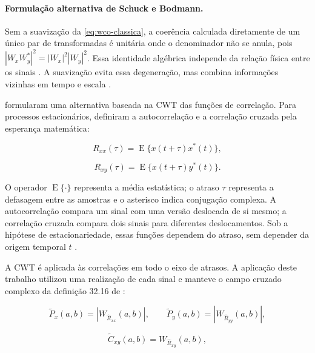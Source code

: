 \paragraph{Formulação alternativa de Schuck e Bodmann.}

Sem a suavização da \autoref{eq:wco-classica}, a coerência calculada diretamente de
um único par de transformadas é unitária onde o denominador não se anula, pois
$|W_xW_y^*|^2=|W_x|^2|W_y|^2$. Essa identidade algébrica independe da relação
física entre os sinais \cite{torrence1998}. A suavização evita essa degeneração,
mas combina informações vizinhas em tempo e escala \cite{grinsted2004}.

 formularam uma alternativa baseada na CWT das funções de
correlação. Para processos estacionários, definiram a autocorrelação e a correlação
cruzada pela esperança matemática:

\begin{equation}\label{eq:autocorr}
  R_{xx}(\tau)=\operatorname{E}\{x(t+\tau)x^*(t)\},
\end{equation}

\begin{equation}\label{eq:crosscorr}
  R_{xy}(\tau)=\operatorname{E}\{x(t+\tau)y^*(t)\}.
\end{equation}

\noindent
O operador $\operatorname{E}\{\cdot\}$ representa a média estatística; o atraso $\tau$
representa a defasagem entre as amostras e o asterisco indica conjugação complexa.
A autocorrelação compara um sinal com uma versão deslocada de si mesmo; a
correlação cruzada compara dois sinais para diferentes deslocamentos. Sob a
hipótese de estacionariedade, essas funções dependem do atraso, sem depender da
origem temporal $t$ \cite{schuck2019}.

A CWT é aplicada às correlações em todo o eixo de atrasos. A aplicação deste
trabalho utilizou uma realização de cada sinal e manteve o campo cruzado
complexo da definição 32.16 de :

\begin{equation}\label{eq:wps-alt}
  \widetilde P_x(a,b)=\left|W_{\widehat R_{xx}}(a,b)\right|,
  \qquad
  \widetilde P_y(a,b)=\left|W_{\widehat R_{yy}}(a,b)\right|,
\end{equation}

\begin{equation}\label{eq:wcs-alt}
  \widetilde C_{xy}(a,b)=W_{\widehat R_{xy}}(a,b),
\end{equation}

